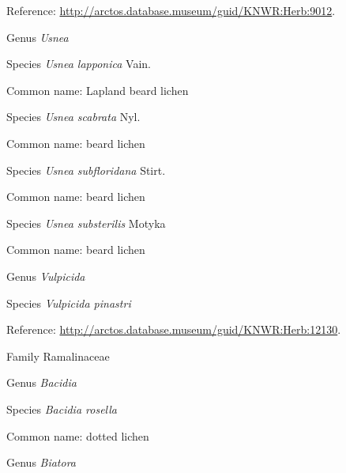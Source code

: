 \documentclass[9pt, article]{memoir}
\begin{document}
\begin{multicols}{2}
Reference: 
\url{http://arctos.database.museum/guid/KNWR:Herb:9012}.

\vspace{6pt}\noindent\hspace{30pt}Genus \textit{Usnea}


\vspace{6pt}\noindent\hspace{36pt}Species \textit{Usnea lapponica} Vain.


Common name: Lapland beard lichen

\vspace{6pt}\noindent\hspace{36pt}Species \textit{Usnea scabrata} Nyl.


Common name: beard lichen

\vspace{6pt}\noindent\hspace{36pt}Species \textit{Usnea subfloridana} Stirt.


Common name: beard lichen

\vspace{6pt}\noindent\hspace{36pt}Species \textit{Usnea substerilis} Motyka


Common name: beard lichen

\vspace{6pt}\noindent\hspace{30pt}Genus \textit{Vulpicida}


\vspace{6pt}\noindent\hspace{36pt}Species \textit{Vulpicida pinastri}


Reference: 
\url{http://arctos.database.museum/guid/KNWR:Herb:12130}.

\vspace{6pt}\noindent\hspace{24pt}Family Ramalinaceae


\vspace{6pt}\noindent\hspace{30pt}Genus \textit{Bacidia}


\vspace{6pt}\noindent\hspace{36pt}Species \textit{Bacidia rosella}


Common name: dotted lichen

\vspace{6pt}\noindent\hspace{30pt}Genus \textit{Biatora}



\end{multicols}
\end{document}
